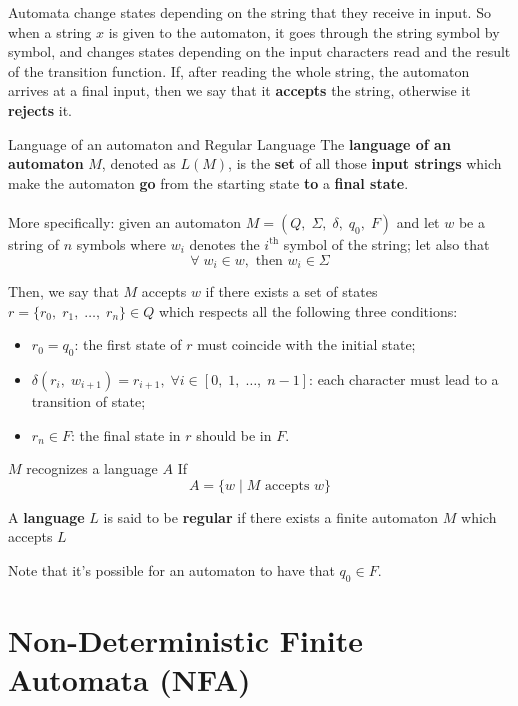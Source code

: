 \noindent Automata change states depending on the string that they receive in input. So when a string $x$ is given to the automaton, it goes through the string symbol by symbol, and changes states depending on the input characters read and the result of the transition function. If, after reading the whole string, the automaton arrives at a final input, then we say that it \textbf{accepts} the string, otherwise it \textbf{rejects} it.

\begin{definition}{Language of an automaton and Regular Language}
    The \textbf{language of an automaton} $M$, denoted as $L(M)$, is the \textbf{set} of all those \textbf{input strings} which make the automaton \textbf{go} from the starting state \textbf{to} a \textbf{final state}.
    \\\\
    \noindent More specifically: given an automaton $M = (Q, \; \Sigma, \; \delta, \; q_{0}, \; F)$ and let $w$ be a string of $n$ symbols where $w_i$ denotes the $i^\text{th}$ symbol of the string; let also that
    \[ \forall \; w_{i} \in w, \text{ then } w_{i} \in \Sigma \]
    
    \noindent Then, we say that $M$ accepts $w$ if there exists a set of states $r = \{ r_{0}, \; r_{1}, \; \dots, \; r_{n} \} \in Q$ which respects all the following three conditions:
    \begin{itemize}
        \item $r_0 = q_0$: the first state of $r$ must coincide with the initial state;
        \item $\delta(r_{i}, \; w_{i + 1}) = r_{i + 1}, \; \forall  i \in [0, \; 1, \; \dots, \; n-1]$: each character must lead to a transition of state;
        \item $r_{n} \in F$: the final state in $r$ should be in $F$.
    \end{itemize}
    
    \noindent $M$ recognizes a language $A$ If
    \[ A = \{ w \; | \; M \text{ accepts } w \} \]

    \noindent A \textbf{language} $L$ is said to be \textbf{regular} if there exists a finite automaton $M$ which accepts $L$
\end{definition}

\noindent Note that it's possible for an automaton to have that $q_{0} \in F$.

\section{Non-Deterministic Finite Automata (NFA)}

